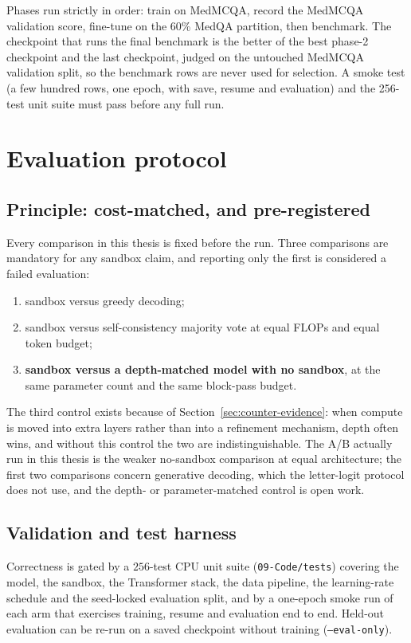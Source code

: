 \documentclass[11pt,a4paper]{article}
\theoremstyle{plain}
\theoremstyle{definition}
\theoremstyle{remark}
\begin{document}
\noindent
Phases run strictly in order: train on MedMCQA, record the MedMCQA validation
score, fine-tune on the 60\% MedQA partition, then benchmark. The checkpoint
that runs the final benchmark is the better of the best phase-2 checkpoint and
the last checkpoint, judged on the untouched MedMCQA validation split, so the
benchmark rows are never used for selection. A smoke test (a few hundred rows,
one epoch, with save, resume and evaluation) and the 256-test unit suite must
pass before any full run.

\section{Evaluation protocol}
\label{sec:eval}

\subsection{Principle: cost-matched, and pre-registered}

\noindent
Every comparison in this thesis is fixed before the run. Three comparisons are
mandatory for any sandbox claim, and reporting only the first is considered a
failed evaluation:
\begin{enumerate}
  \item sandbox versus greedy decoding;
  \item sandbox versus self-consistency majority vote \cite{wang2022sc} at
    equal FLOPs and equal token budget;
  \item \textbf{sandbox versus a depth-matched model with no sandbox}, at the
    same parameter count and the same block-pass budget.
\end{enumerate}
The third control exists because of Section~\ref{sec:counter-evidence}: when
compute is moved into extra layers rather than into a refinement mechanism,
depth often wins, and without this control the two are indistinguishable.
The A/B actually run in this thesis is the weaker no-sandbox comparison at
equal architecture; the first two comparisons concern generative decoding,
which the letter-logit protocol does not use, and the depth- or
parameter-matched control is open work.

\subsection{Validation and test harness}

\noindent
Correctness is gated by a $256$-test CPU unit suite
(\texttt{09-Code/tests}) covering the model, the sandbox, the Transformer
stack, the data pipeline, the learning-rate schedule and the seed-locked
evaluation split, and by a one-epoch smoke run of each arm that exercises
training, resume and evaluation end to end. Held-out evaluation can be re-run
on a saved checkpoint without training (\texttt{--eval-only}).
\end{document}
